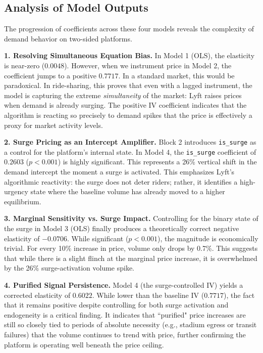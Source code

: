 \documentclass[11pt, letterpaper]{article}
\begin{document}
\subsection{Analysis of Model Outputs}

The progression of coefficients across these four models reveals the complexity of demand behavior on two-sided platforms.

\textbf{1. Resolving Simultaneous Equation Bias.} In Model 1 (OLS), the elasticity is near-zero ($0.0048$). However, when we instrument price in Model 2, the coefficient jumps to a positive $0.7717$. In a standard market, this would be paradoxical. In ride-sharing, this proves that even with a lagged instrument, the model is capturing the extreme \textit{simultaneity} of the market: Lyft raises prices when demand is already surging. The positive IV coefficient indicates that the algorithm is reacting so precisely to demand spikes that the price is effectively a proxy for market activity levels.

\textbf{2. Surge Pricing as an Intercept Amplifier.} Block 2 introduces \texttt{is\_surge} as a control for the platform's internal state. In Model 4, the \texttt{is\_surge} coefficient of $0.2603$ ($p < 0.001$) is highly significant. This represents a 26\% vertical shift in the demand intercept the moment a surge is activated. This emphasizes Lyft's algorithmic reactivity: the surge does not deter riders; rather, it identifies a high-urgency state where the baseline volume has already moved to a higher equilibrium.

\textbf{3. Marginal Sensitivity vs. Surge Impact.} Controlling for the binary state of the surge in Model 3 (OLS) finally produces a theoretically correct negative elasticity of $-0.0706$. While significant ($p < 0.001$), the magnitude is economically trivial. For every 10\% increase in price, volume only drops by 0.7\%. This suggests that while there is a slight flinch at the marginal price increase, it is overwhelmed by the 26\% surge-activation volume spike.

\textbf{4. Purified Signal Persistence.} Model 4 (the surge-controlled IV) yields a corrected elasticity of $0.6022$. While lower than the baseline IV ($0.7717$), the fact that it remains positive despite controlling for both surge activation and endogeneity is a critical finding. It indicates that ``purified" price increases are still so closely tied to periods of absolute necessity (e.g., stadium egress or transit failures) that the volume continues to trend with price, further confirming the platform is operating well beneath the price ceiling.
\end{document}
